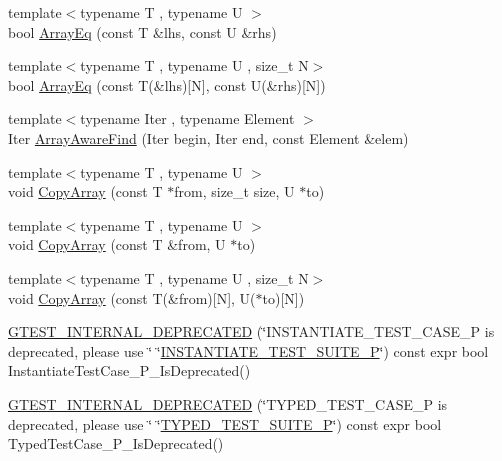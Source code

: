 \begin{DoxyCompactItemize}
\item 
{\footnotesize template$<$typename T , typename U $>$ }\\bool \mbox{\hyperlink{namespacetesting_1_1internal_a49b4d0ee49c0f8c93bab29ebd20630cc}{Array\+Eq}} (const T \&lhs, const U \&rhs)
\item 
{\footnotesize template$<$typename T , typename U , size\+\_\+t N$>$ }\\bool \mbox{\hyperlink{namespacetesting_1_1internal_a5cb6f81ee827130024261121c742b26c}{Array\+Eq}} (const T(\&lhs)\mbox{[}N\mbox{]}, const U(\&rhs)\mbox{[}N\mbox{]})
\item 
{\footnotesize template$<$typename Iter , typename Element $>$ }\\Iter \mbox{\hyperlink{namespacetesting_1_1internal_a94a857fe6ff32cf4fdc4769a4071f239}{Array\+Aware\+Find}} (Iter begin, Iter end, const Element \&elem)
\item 
{\footnotesize template$<$typename T , typename U $>$ }\\void \mbox{\hyperlink{namespacetesting_1_1internal_afb1b9728aaaf6d9fe6246a19cfe3f7f5}{Copy\+Array}} (const T $\ast$from, size\+\_\+t size, U $\ast$to)
\item 
{\footnotesize template$<$typename T , typename U $>$ }\\void \mbox{\hyperlink{namespacetesting_1_1internal_a84d0e746ba0827cc52b53d22000de0e8}{Copy\+Array}} (const T \&from, U $\ast$to)
\item 
{\footnotesize template$<$typename T , typename U , size\+\_\+t N$>$ }\\void \mbox{\hyperlink{namespacetesting_1_1internal_a1e7ae855686720615dcd5754c8181c62}{Copy\+Array}} (const T(\&from)\mbox{[}N\mbox{]}, U($\ast$to)\mbox{[}N\mbox{]})
\item 
\mbox{\hyperlink{namespacetesting_1_1internal_ac57c9bf3c92c207ba11b83ce05d0359a}{G\+T\+E\+S\+T\+\_\+\+I\+N\+T\+E\+R\+N\+A\+L\+\_\+\+D\+E\+P\+R\+E\+C\+A\+T\+ED}} (\char`\"{}I\+N\+S\+T\+A\+N\+T\+I\+A\+T\+E\+\_\+\+T\+E\+S\+T\+\_\+\+C\+A\+S\+E\+\_\+P is deprecated, please use \char`\"{} \char`\"{}\mbox{\hyperlink{namespacetesting_a91b2d3c4e8c89bcec13270ae8585d549}{I\+N\+S\+T\+A\+N\+T\+I\+A\+T\+E\+\_\+\+T\+E\+S\+T\+\_\+\+S\+U\+I\+T\+E\+\_\+P}}\char`\"{}) const expr bool Instantiate\+Test\+Case\+\_\+\+P\+\_\+\+Is\+Deprecated()
\item 
\mbox{\hyperlink{namespacetesting_1_1internal_ac2bac410cd8b9ecbc8f4ccc921e61cee}{G\+T\+E\+S\+T\+\_\+\+I\+N\+T\+E\+R\+N\+A\+L\+\_\+\+D\+E\+P\+R\+E\+C\+A\+T\+ED}} (\char`\"{}T\+Y\+P\+E\+D\+\_\+\+T\+E\+S\+T\+\_\+\+C\+A\+S\+E\+\_\+P is deprecated, please use \char`\"{} \char`\"{}\mbox{\hyperlink{namespacetesting_ab6095d387aee3b6b71919177827e78f5}{T\+Y\+P\+E\+D\+\_\+\+T\+E\+S\+T\+\_\+\+S\+U\+I\+T\+E\+\_\+P}}\char`\"{}) const expr bool Typed\+Test\+Case\+\_\+\+P\+\_\+\+Is\+Deprecated()

\end{DoxyCompactItemize}
